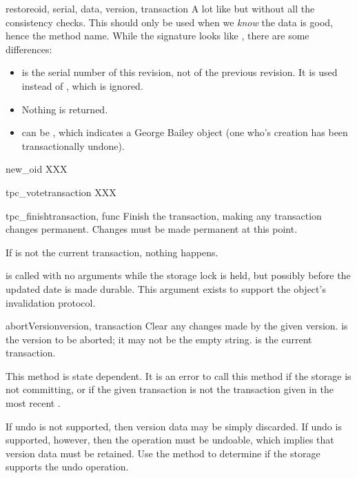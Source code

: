 \documentclass{howto}
\begin{document}
\begin{methoddesc}{restore}{oid, serial, data, version, transaction}
  A lot like  but without all the consistency checks.
  This should only be used when we \emph{know} the data is good, hence
  the method name.  While the signature looks like ,
  there are some differences:

  \begin{itemize}
        \item {} is the serial number of this revision, not
          of the previous revision.  It is used instead of
          , which is ignored.

        \item Nothing is returned.

        \item {} can be , which indicates a George
          Bailey object (one who's creation has been transactionally
          undone).
  \end{itemize}
\end{methoddesc}

\begin{methoddesc}{new_oid}{}
  XXX
\end{methoddesc}

\begin{methoddesc}{tpc_vote}{transaction}
  XXX
\end{methoddesc}

\begin{methoddesc}{tpc_finish}{transaction, func}
  Finish the transaction, making any transaction changes
  permanent.  Changes must be made permanent at this point.

  If  is not the current transaction, nothing
  happens.
  
   is called with no arguments while the storage lock is
  held, but possibly before the updated date is made durable.  This
  argument exists to support the  object's
  invalidation protocol.
\end{methoddesc}

\begin{methoddesc}{abortVersion}{version, transaction}
  Clear any changes made by the given version.   is the
  version to be aborted; it may not be the empty string.
   is the current transaction.

  This method is state dependent. It is an error to call this method
  if the storage is not committing, or if the given transaction is not
  the transaction given in the most recent .

  If undo is not supported, then version data may be simply
  discarded.  If undo is supported, however, then the
   operation must be undoable, which implies
  that version data must be retained.  Use the 
  method to determine if the storage supports the undo operation.
\end{methoddesc}
\end{document}
